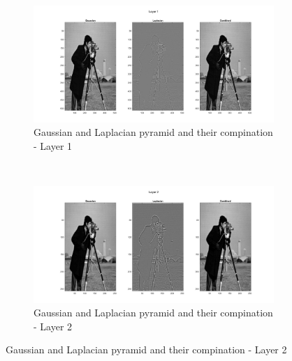 \documentclass{article}
\begin{document}
	\begin{figure}[h!]
		\centering
		\begin{subfigure}[t]{0.5\textwidth}
			\centering
			\includegraphics[width=\linewidth]{./output_images/layer_1.jpg}
			\caption{Gaussian and Laplacian pyramid and their compination - Layer 1}
		\end{subfigure}%
		~
		\begin{subfigure}[t]{0.5\textwidth}
			\centering
			\includegraphics[width=\linewidth]{./output_images/layer_2.jpg}
			\caption{Gaussian and Laplacian pyramid and their compination - Layer 2}
		\end{subfigure}%
		

\end{figure}
\end{document}
